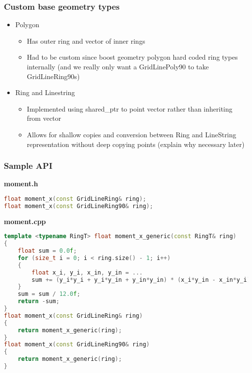 \documentclass{beamer}
\begin{document}
\begin{frame}
    \frametitle{Custom base geometry types}
    \begin{itemize}
        \item Polygon
            \begin{itemize}
                \item Has outer ring and vector of inner rings
                \item Had to be custom since boost geometry polygon hard coded ring types internally (and we really only want a GridLinePoly90 to take GridLineRing90s)
            \end{itemize}
        \item Ring and Linestring
            \begin{itemize}
                \item Implemented using shared\_ptr to point vector rather than inheriting from vector
                \item Allows for shallow copies and conversion between Ring and LineString representation without deep copying points (explain why necessary later)
            \end{itemize}
    \end{itemize}
\end{frame}

\begin{frame}[fragile]
    \frametitle{Sample API}

    \textbf{moment.h}
    \begin{lstlisting}[language=C++, basicstyle=\tiny]
float moment_x(const GridLineRing& ring);
float moment_x(const GridLineRing90& ring);    
    \end{lstlisting}

    \textbf{moment.cpp}
    \begin{lstlisting}[language=C++, basicstyle=\tiny]
template <typename RingT> float moment_x_generic(const RingT& ring)
{
    float sum = 0.0f;
    for (size_t i = 0; i < ring.size() - 1; i++)
    {
        float x_i, y_i, x_in, y_in = ...
        sum += (y_i*y_i + y_i*y_in + y_in*y_in) * (x_i*y_in - x_in*y_i);
    }
    sum = sum / 12.0f;
    return -sum;
}
float moment_x(const GridLineRing& ring) 
{
    return moment_x_generic(ring);
}
float moment_x(const GridLineRing90& ring)
{
    return moment_x_generic(ring);
}
    \end{lstlisting}
\end{frame}
\end{document}
